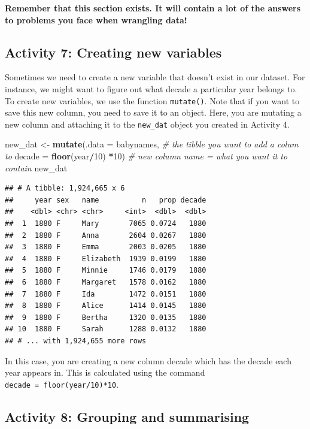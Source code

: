 \documentclass[]{book}
\newenvironment{Shaded}{\begin{snugshade}}{\end{snugshade}}
\newcommand{\CommentTok}[1]{\textcolor[rgb]{0.56,0.35,0.01}{\textit{#1}}}
\newcommand{\DataTypeTok}[1]{\textcolor[rgb]{0.13,0.29,0.53}{#1}}
\newcommand{\DecValTok}[1]{\textcolor[rgb]{0.00,0.00,0.81}{#1}}
\newcommand{\KeywordTok}[1]{\textcolor[rgb]{0.13,0.29,0.53}{\textbf{#1}}}
\newcommand{\NormalTok}[1]{#1}
\newcommand{\OperatorTok}[1]{\textcolor[rgb]{0.81,0.36,0.00}{\textbf{#1}}}
\newcommand{\StringTok}[1]{\textcolor[rgb]{0.31,0.60,0.02}{#1}}
\begin{document}
\textbf{Remember that this section exists. It will contain a lot of the answers to problems you face when wrangling data!}

\hypertarget{mutate}{%
\subsection{Activity 7: Creating new variables}\label{mutate}}

Sometimes we need to create a new variable that doesn't exist in our dataset. For instance, we might want to figure out what decade a particular year belongs to. To create new variables, we use the function \texttt{mutate()}. Note that if you want to save this new column, you need to save it to an object. Here, you are mutating a new column and attaching it to the \texttt{new\_dat} object you created in Activity 4.

\begin{Shaded}
\begin{Highlighting}[]
\NormalTok{new_dat <-}\StringTok{ }\KeywordTok{mutate}\NormalTok{(}\DataTypeTok{.data =}\NormalTok{ babynames, }\CommentTok{# the tibble you want to add a colum to}
                  \DataTypeTok{decade =} \KeywordTok{floor}\NormalTok{(year}\OperatorTok{/}\DecValTok{10}\NormalTok{) }\OperatorTok{*}\DecValTok{10}\NormalTok{) }\CommentTok{# new column name = what you want it to contain}
\NormalTok{new_dat}
\end{Highlighting}
\end{Shaded}

\begin{verbatim}
## # A tibble: 1,924,665 x 6
##     year sex   name          n   prop decade
##    <dbl> <chr> <chr>     <int>  <dbl>  <dbl>
##  1  1880 F     Mary       7065 0.0724   1880
##  2  1880 F     Anna       2604 0.0267   1880
##  3  1880 F     Emma       2003 0.0205   1880
##  4  1880 F     Elizabeth  1939 0.0199   1880
##  5  1880 F     Minnie     1746 0.0179   1880
##  6  1880 F     Margaret   1578 0.0162   1880
##  7  1880 F     Ida        1472 0.0151   1880
##  8  1880 F     Alice      1414 0.0145   1880
##  9  1880 F     Bertha     1320 0.0135   1880
## 10  1880 F     Sarah      1288 0.0132   1880
## # ... with 1,924,655 more rows
\end{verbatim}

In this case, you are creating a new column decade which has the decade each year appears in. This is calculated using the command \texttt{decade\ =\ floor(year/10)*10}.

\hypertarget{activity-8-grouping-and-summarising}{%
\subsection{Activity 8: Grouping and summarising}\label{activity-8-grouping-and-summarising}}
\end{document}
